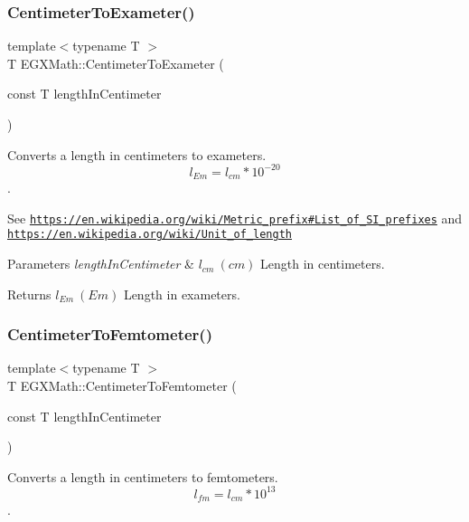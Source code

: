 \subsubsection{\texorpdfstring{Centimeter\+To\+Exameter()}{CentimeterToExameter()}}
{\footnotesize\ttfamily template$<$typename T $>$ \\
T E\+G\+X\+Math\+::\+Centimeter\+To\+Exameter (\begin{DoxyParamCaption}\item[{const T}]{length\+In\+Centimeter }\end{DoxyParamCaption})}



Converts a length in centimeters to exameters. \[ l_{Em}=l_{cm} * 10^{-20} \]. 

See \href{https://en.wikipedia.org/wiki/Metric_prefix#List_of_SI_prefixes}{\tt https\+://en.\+wikipedia.\+org/wiki/\+Metric\+\_\+prefix\#\+List\+\_\+of\+\_\+\+S\+I\+\_\+prefixes} and \href{https://en.wikipedia.org/wiki/Unit_of_length}{\tt https\+://en.\+wikipedia.\+org/wiki/\+Unit\+\_\+of\+\_\+length} 
\begin{DoxyParams}{Parameters}
{\em length\+In\+Centimeter} & $ l_{cm}\ (cm)$ Length in centimeters. \\
\hline
\end{DoxyParams}
\begin{DoxyReturn}{Returns}
$ l_{Em}\ (Em)$ Length in exameters. 
\end{DoxyReturn}
\mbox{\label{group___e_g_x_math-_conversions-_length_conversions-_centimeter-_s_i_ga1d86301dcf9e8d9d75127c3d998f9c0b}} 
\subsubsection{\texorpdfstring{Centimeter\+To\+Femtometer()}{CentimeterToFemtometer()}}
{\footnotesize\ttfamily template$<$typename T $>$ \\
T E\+G\+X\+Math\+::\+Centimeter\+To\+Femtometer (\begin{DoxyParamCaption}\item[{const T}]{length\+In\+Centimeter }\end{DoxyParamCaption})}



Converts a length in centimeters to femtometers. \[ l_{fm}=l_{cm} * 10^{13} \]. 

